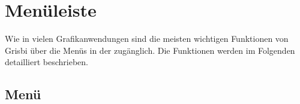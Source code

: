 \section{Menüleiste\label{home-menus}}

Wie in vielen Grafikanwendungen sind die meisten wichtigen Funktionen von Grisbi über die Menüs in der  zugänglich. Die Funktionen werden im Folgenden detailliert beschrieben.%


\subsection{Menü \label{home-menus-file}}

